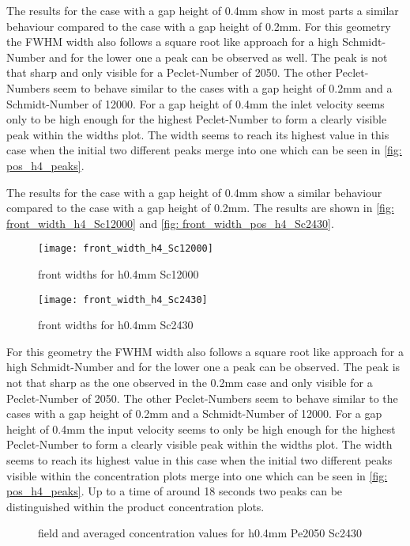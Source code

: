 \documentclass[../thesis.tex]{subfiles}
\begin{document}
The results for the case with a gap height of 0.4mm show in most parts a similar behaviour compared to the case with a gap height of 0.2mm. For this geometry the FWHM width also follows a square root like approach for a high Schmidt-Number and for the lower one a peak can be observed as well. The peak is not that sharp and only visible for a Peclet-Number of 2050. The other Peclet-Numbers seem to behave similar to the cases with a gap height of 0.2mm and a Schmidt-Number of 12000. For a gap height of 0.4mm the inlet velocity seems only to be high enough for the highest Peclet-Number to form a clearly visible peak within the widths plot. The width seems to reach its highest value in this case when the initial two different peaks merge into one which can be seen in \autoref{fig: pos_h4_peaks}.

The results for the case with a gap height of 0.4mm show a similar behaviour compared to the case with a gap height of 0.2mm. The results are shown in \autoref{fig: front_width_h4_Sc12000} and \autoref{fig: front_width_pos_h4_Sc2430}.
\begin{figure}[htbp]
	\centering
	\texttt{[image: front\_width\_h4\_Sc12000]}
	\caption{front widths for h0.4mm Sc12000\label{fig: front_width_h4_Sc12000}}\bigskip
	\texttt{[image: front\_width\_h4\_Sc2430]}
	\caption{front widths for h0.4mm Sc2430\label{fig: front_width_pos_h4_Sc2430}}
\end{figure}
 For this geometry the FWHM width also follows a square root like approach for a high Schmidt-Number and for the lower one a peak can be observed. The peak is not that sharp as the one observed in the 0.2mm case and only visible for a Peclet-Number of 2050. The other Peclet-Numbers seem to behave similar to the cases with a gap height of 0.2mm and a Schmidt-Number of 12000. For a gap height of 0.4mm the input velocity seems to only be high enough for the highest Peclet-Number to form a clearly visible peak within the widths plot. The width seems to reach its highest value in this case when the initial two different peaks visible within the concentration plots merge into one which can be seen in \autoref{fig: pos_h4_peaks}. Up to a time of around 18 seconds two peaks can be distinguished within the product concentration plots. 
\begin{figure}[htb]
	\centering
	\qquad
	\caption{field and averaged concentration values for h0.4mm Pe2050 Sc2430}%
	\label{fig: pos_h4_peaks}%
\end{figure}
\end{document}
